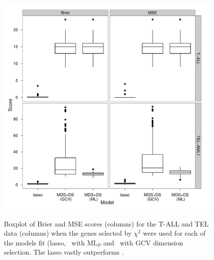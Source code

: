 \begin{figure}
\centering
\includegraphics[width=6in]{gds/figs/sim-msebrier.pdf} \\
\caption{Boxplot of Brier and MSE scores (columns) for the T-ALL and TEL data (columns) when the genes selected by $\chi^2$ were used for each of the models fit (lasso, \mdsds\ with $\text{ML}_P$ and \mdsds\ with GCV dimension selection. The lasso vastly outperforms \mdsds.}
\label{leuk-sim-boxplot}
\end{figure}

